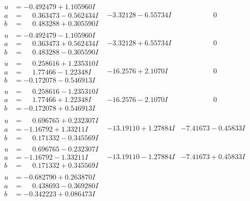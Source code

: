 \documentclass[1p]{elsarticle_modified}
\theoremstyle{definition}
\begin{document}
$$\begin{array}{c|c|c}
\begin{aligned}
u &= -0.492479 + 1.105960 I \\
a &= \phantom{-}0.363473 - 0.562434 I \\
b &= \phantom{-}0.483288 + 0.305590 I\end{aligned}
 & -3.32128 - 6.55734 I & \phantom{-0.000000 } 0 \\ \hline\begin{aligned}
u &= -0.492479 - 1.105960 I \\
a &= \phantom{-}0.363473 + 0.562434 I \\
b &= \phantom{-}0.483288 - 0.305590 I\end{aligned}
 & -3.32128 + 6.55734 I & \phantom{-0.000000 } 0 \\ \hline\begin{aligned}
u &= \phantom{-}0.258616 + 1.235310 I \\
a &= \phantom{-}1.77466 - 1.22348 I \\
b &= -0.172078 - 0.546913 I\end{aligned}
 & -16.2576 + 2.1070 I & \phantom{-0.000000 } 0 \\ \hline\begin{aligned}
u &= \phantom{-}0.258616 - 1.235310 I \\
a &= \phantom{-}1.77466 + 1.22348 I \\
b &= -0.172078 + 0.546913 I\end{aligned}
 & -16.2576 - 2.1070 I & \phantom{-0.000000 } 0 \\ \hline\begin{aligned}
u &= \phantom{-}0.696765 + 0.232307 I \\
a &= -1.16792 + 1.33211 I \\
b &= \phantom{-}0.171332 - 0.345569 I\end{aligned}
 & -13.19110 + 1.27884 I & -7.41673 - 0.45833 I \\ \hline\begin{aligned}
u &= \phantom{-}0.696765 - 0.232307 I \\
a &= -1.16792 - 1.33211 I \\
b &= \phantom{-}0.171332 + 0.345569 I\end{aligned}
 & -13.19110 - 1.27884 I & -7.41673 + 0.45833 I \\ \hline\begin{aligned}
u &= -0.682790 + 0.263870 I \\
a &= \phantom{-}0.438693 - 0.369280 I \\
b &= -0.342223 + 0.086473 I\end{aligned}

\end{array}$$
\end{document}
